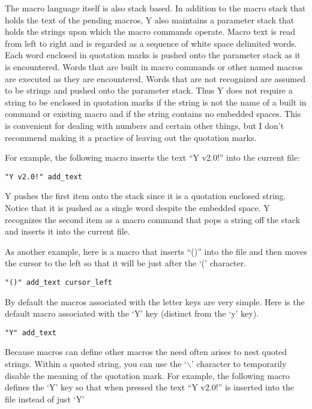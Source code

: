 The macro language itself is also stack based. In addition to the macro stack that holds the
text of the pending macros, Y also maintains a parameter stack that holds the strings upon which
the macro commands operate. Macro text is read from left to right and is regarded as a sequence
of white space delimited words. Each word enclosed in quotation marks is pushed onto the
parameter stack as it is encountered. Words that are built in macro commands or other named
macros are executed as they are encountered. Words that are not recognized are assumed to be
strings and pushed onto the parameter stack. Thus Y does not require a string to be enclosed in
quotation marks if the string is not the name of a built in command or existing macro and if the
string contains no embedded spaces. This is convenient for dealing with numbers and certain
other things, but I don't recommend making it a practice of leaving out the quotation marks.

For example, the following macro inserts the text ``Y v2.0!'' into the current file:

\begin{verbatim}
"Y v2.0!" add_text
\end{verbatim}

Y pushes the first item onto the stack since it is a quotation enclosed string. Notice that it
is pushed as a single word despite the embedded space. Y recognizes the second item as a macro
command that pops a string off the stack and inserts it into the current file.

As another example, here is a macro that inserts ``()'' into the file and then moves the cursor
to the left so that it will be just after the `(' character.

\begin{verbatim}
"()" add_text cursor_left
\end{verbatim}

By default the macros associated with the letter keys are very simple. Here is the default macro
associated with the `Y' key (distinct from the `y' key).

\begin{verbatim}
"Y" add_text
\end{verbatim}

Because macros can define other macros the need often arises to nest quoted strings. Within a
quoted string, you can use the `$\backslash$' character to temporarily disable the meaning of
the quotation mark. For example, the following macro defines the `Y' key so that when pressed
the text ``Y v2.0!'' is inserted into the file instead of just `Y'

